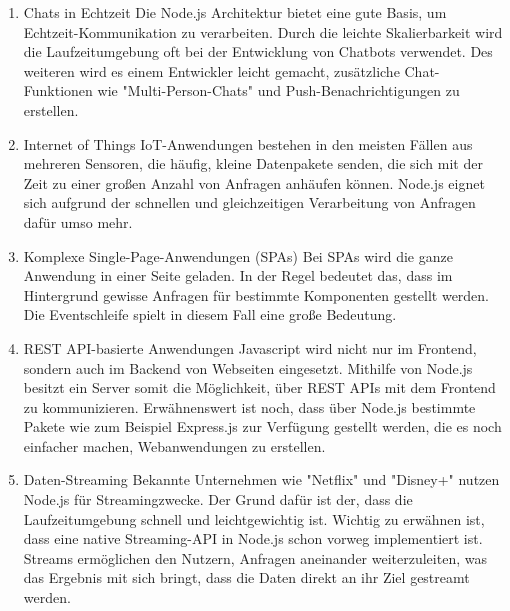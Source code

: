 \begin{enumerate}
    \item Chats in Echtzeit
    \newline Die Node.js Architektur bietet eine gute Basis, um Echtzeit-Kommunikation zu verarbeiten. Durch die leichte Skalierbarkeit wird die Laufzeitumgebung oft bei der Entwicklung von Chatbots verwendet. Des weiteren wird es einem Entwickler leicht gemacht, zusätzliche Chat-Funktionen wie "Multi-Person-Chats" und Push-Benachrichtigungen zu erstellen. \cite{Anwendungen}
    \item Internet of Things
    \newline
    IoT-Anwendungen bestehen in den meisten Fällen aus mehreren Sensoren, die häufig, kleine Datenpakete senden, die sich mit der Zeit zu einer großen Anzahl von Anfragen anhäufen können. Node.js eignet sich aufgrund der schnellen und gleichzeitigen Verarbeitung von Anfragen dafür umso mehr. \cite{Anwendungen}
    \item Komplexe Single-Page-Anwendungen (SPAs)
    \newline
    Bei SPAs wird die ganze Anwendung in einer Seite geladen. In der Regel bedeutet das, dass im Hintergrund gewisse Anfragen für bestimmte Komponenten gestellt werden. Die Eventschleife spielt in diesem Fall eine große Bedeutung. \cite{Anwendungen}
    \item REST API-basierte Anwendungen
    \newline
    Javascript wird nicht nur im Frontend, sondern auch im Backend von Webseiten eingesetzt. Mithilfe von Node.js besitzt ein Server somit die Möglichkeit, über REST APIs mit dem Frontend zu kommunizieren. Erwähnenswert ist noch, dass über Node.js bestimmte Pakete wie zum Beispiel Express.js zur Verfügung gestellt werden, die es noch einfacher machen, Webanwendungen zu erstellen. \cite{Anwendungen}
    \item Daten-Streaming
    \newline
    Bekannte Unternehmen wie "Netflix" und "Disney+" nutzen Node.js für Streamingzwecke. Der Grund dafür ist der, dass die Laufzeitumgebung schnell und leichtgewichtig ist. Wichtig zu erwähnen ist, dass eine native Streaming-API in Node.js schon vorweg implementiert ist. Streams ermöglichen den Nutzern, Anfragen aneinander weiterzuleiten, was das Ergebnis mit sich bringt, dass die Daten direkt an ihr Ziel gestreamt werden. \cite{Anwendungen}
    
\end{enumerate}




